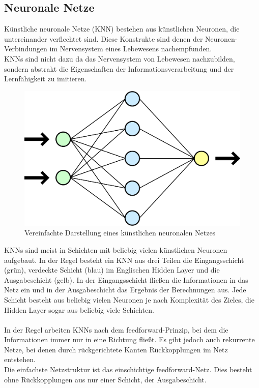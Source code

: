 \documentclass[12pt,oneside,a4paper,parskip]{scrbook}
\begin{document}
\subsection{Neuronale Netze}
Künstliche neuronale Netze (KNN) bestehen aus künstlichen Neuronen, die untereinander verflechtet sind. Diese Konstrukte sind denen der Neuronen-Verbindungen im Nervensystem eines Lebewesens nachempfunden. \\
KNNs sind nicht dazu da das Nervensystem von Lebewesen nachzubilden, sondern abstrakt die Eigenschaften der Informationsverarbeitung und der Lernfähigkeit zu imitieren.
\begin{figure}[h]
	\begin{center}
		\includegraphics[width=12cm]{Bilder/Neurales_Netz.png}
		\caption{Vereinfachte Darstellung eines künstlichen neuronalen Netzes}
		\label{fig:wikiNeuronalesNetz}
	\end{center}
\end{figure}
KNNs sind meist in Schichten mit beliebig vielen künstlichen Neuronen aufgebaut. In der Regel besteht ein KNN aus drei Teilen die Eingangsschicht (grün), verdeckte Schicht (blau) im Englischen Hidden Layer und die Ausgabeschicht (gelb). In der Eingangsschicht fließen die Informationen in das Netz ein und in der Ausgabeschicht das Ergebnis der Berechnungen aus. Jede Schicht besteht aus beliebig vielen Neuronen je nach Komplexität des Zieles, die Hidden Layer sogar aus beliebig viele Schichten.
\\\\
In der Regel arbeiten KNNs nach dem feedforward-Prinzip, bei dem die Informationen immer nur in eine Richtung fließt. Es gibt jedoch auch rekurrente Netze, bei denen durch rückgerichtete Kanten Rückkopplungen im Netz entstehen. \\
Die einfachste Netzstruktur ist das einschichtige feedforward-Netz. Dies besteht ohne Rückkopplungen aus nur einer Schicht, der Ausgabeschicht.
\end{document}
